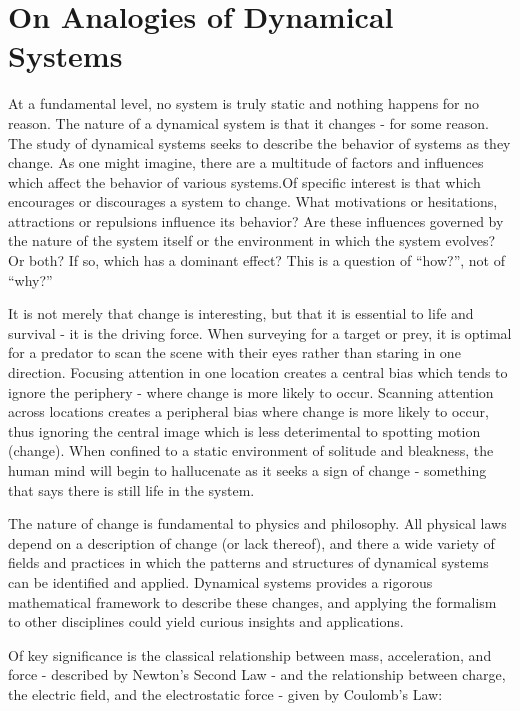 \documentclass[
  letterpaper,
  DIV=11,
  numbers=noendperiod]{scrartcl}
\author{}
\date{}
\begin{document}
\section{On Analogies of Dynamical
Systems}\label{on-analogies-of-dynamical-systems}

At a fundamental level, no system is truly static and nothing happens
for no reason. The nature of a dynamical system is that it changes - for
some reason. The study of dynamical systems seeks to describe the
behavior of systems as they change. As one might imagine, there are a
multitude of factors and influences which affect the behavior of various
systems.Of specific interest is that which encourages or discourages a
system to change. What motivations or hesitations, attractions or
repulsions influence its behavior? Are these influences governed by the
nature of the system itself or the environment in which the system
evolves? Or both? If so, which has a dominant effect? This is a question
of ``how?'', not of ``why?''

It is not merely that change is interesting, but that it is essential to
life and survival - it is the driving force. When surveying for a target
or prey, it is optimal for a predator to scan the scene with their eyes
rather than staring in one direction. Focusing attention in one location
creates a central bias which tends to ignore the periphery - where
change is more likely to occur. Scanning attention across locations
creates a peripheral bias where change is more likely to occur, thus
ignoring the central image which is less deterimental to spotting motion
(change). When confined to a static environment of solitude and
bleakness, the human mind will begin to hallucenate as it seeks a sign
of change - something that says there is still life in the system.

The nature of change is fundamental to physics and philosophy. All
physical laws depend on a description of change (or lack thereof), and
there a wide variety of fields and practices in which the patterns and
structures of dynamical systems can be identified and applied. Dynamical
systems provides a rigorous mathematical framework to describe these
changes, and applying the formalism to other disciplines could yield
curious insights and applications.

Of key significance is the classical relationship between mass,
acceleration, and force - described by Newton's Second Law - and the
relationship between charge, the electric field, and the electrostatic
force - given by Coulomb's Law:
\end{document}
